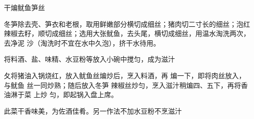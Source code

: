\begin{recipe}{干煸鱿鱼笋丝}

\ingredients


\cooking

\step 冬笋除去壳、笋衣和老根，取用鲜嫩部分横切成细丝；猪肉切二寸长的细丝；泡红
辣椒去籽，顺切成细丝；选用大张鱿鱼，去头尾，横切成细丝，用温水淘洗两次，去净泥
沙（淘洗时不宜在水中久泡），挤干水待用。

\step 将料酒、盐、味精、水豆粉等放入小碗中搅匀，成为滋汁

夂将猪油入锅烧红，放入鱿鱼丝煸炒后，烹入料酒，再 煸一下，即将肉丝放入，与鱿鱼
丝一同炒熟；随后放入冬笋 辣椒丝炒匀，烹入滋汁稍煸四、五下，再将香油淋于菜 上炒
匀，即起锅入盘上席。

\notes

此菜干香味美，为佐酒佳肴。另一作法不加水豆粉不烹滋汁

\end{recipe}

